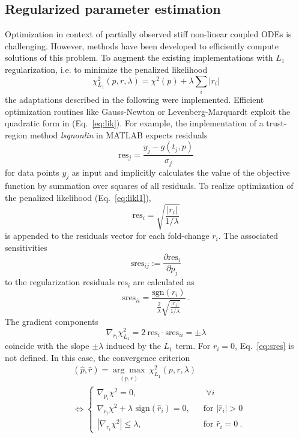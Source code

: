 \documentclass{bioinfo}
\begin{document}
\subsection{Regularized parameter estimation}
Optimization in context of partially observed stiff non-linear coupled ODEs is challenging.
However, methods have been developed to efficiently compute solutions of this problem.
To augment the existing implementations with $L_1$ regularization, i.e. to minimize the penalized likelihood
\begin{equation}
	\chi^2_{L_1}(p,r,\lambda) = \chi^2(p) + \lambda \sum_i |r_i|\label{eq:likl1}
\end{equation}
the adaptations described in the following were implemented.
Efficient optimization routines like Gauss-Newton or Levenberg-Marquardt exploit the quadratic form in (Eq.~\ref{eq:lik}).
For example, the implementation of a trust-region method \textit{lsqnonlin} in MATLAB expects residuals
\begin{equation}
	\text{res}_j = \frac{y_j-g(t_j,p)}{\sigma_j}
\end{equation}
for data points $y_j$ as input and implicitly calculates the value of the objective function by summation over squares of all residuals.
To realize optimization of the penalized likelihood (Eq.~\ref{eq:likl1}),
\begin{equation}
	\text{res}_i = \sqrt{\frac{|r_i|}{1/\lambda}}
\end{equation}
is appended to the residuals vector for each fold-change $r_i$.
The associated sensitivities
\begin{equation}
	\text{sres}_{ij} := \frac{\partial \text{res}_i}{\partial p_j} 
\end{equation}
to the regularization residuals $\text{res}_i$ are calculated as
\begin{equation}
	\text{sres}_{ii} = \frac{\text{sgn}(r_i)}{\frac{2}{\lambda}\sqrt{\frac{|r_i|}{1/\lambda}}} \:.\label{eq:sres}
\end{equation}
The gradient components
\begin{equation}
	\nabla_{r_i}\chi^2_{L_1} = 2 \: \text{res}_i \cdot \text{sres}_{ii} = \pm \lambda
\end{equation}
coincide with the slope $\pm \lambda$ induced by the $L_1$ term.
For $r_i = 0$, Eq.~\ref{eq:sres} is not defined.
In this case, the convergence criterion
\begin{align}
	&(\hat p, \hat r) = \underset{(p,r)}{\arg \max} \: \chi^2_{L_1}(p,r,\lambda) \\
	&\Leftrightarrow
	\begin{cases}
	\nabla_{p_i} \chi^2 = 0, \:\:& \text{ }\forall i\\
	\nabla_{r_i} \chi^2 + \lambda \text{ sign}(\hat r_i) = 0, \:\:& \text{ for } |\hat r_i| > 0\\
	|\nabla_{r_i} \chi^2| \le \lambda, \:\:& \text{ for } \hat r_i = 0 \:.
	\end{cases}
	\label{eq:convcrit}
\end{align}
\end{document}
